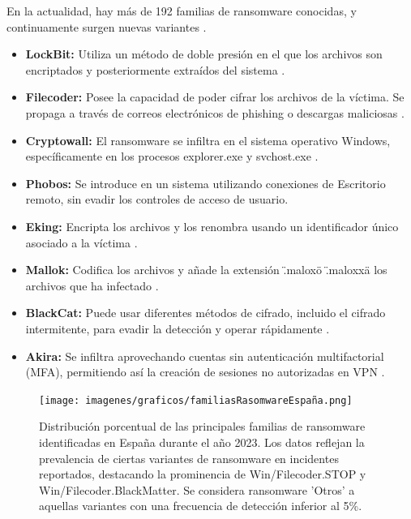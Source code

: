 
En la actualidad, hay más de 192 familias de ransomware conocidas, y continuamente surgen nuevas variantes \autocite{Herrero2024}.

\begin{itemize}
    \item \textbf{LockBit:} Utiliza un método de doble presión en el que los archivos son encriptados y posteriormente extraídos del sistema \autocite{Bhushan2024}.
    \item \textbf{Filecoder:} Posee la capacidad de poder cifrar los archivos de la víctima. Se propaga a través de correos electrónicos de phishing o descargas maliciosas \autocite{WeLiveSecurity2013}.
    \item \textbf{Cryptowall:} El ransomware se infiltra en el sistema operativo Windows, específicamente en los procesos explorer.exe y svchost.exe \autocite{Proofpoint2023}.
    \item \textbf{Phobos:} Se introduce en un sistema utilizando conexiones de Escritorio remoto, sin evadir los controles de acceso de usuario.
    \item \textbf{Eking:} Encripta los archivos y los renombra usando un identificador único asociado a la víctima \autocite{Infordisa2021}.
    \item \textbf{Mallok:} Codifica los archivos y añade la extensión \".malox\" o \".maloxx\" a los archivos que ha infectado \autocite{CyberzaintzaND}.
    \item \textbf{BlackCat:} Puede usar diferentes métodos de cifrado, incluido el cifrado intermitente, para evadir la detección y operar rápidamente \autocite{JDRRCiberseguridad2022}.
    \item \textbf{Akira:} Se infiltra aprovechando cuentas sin autenticación multifactorial (MFA), permitiendo así la creación de sesiones no autorizadas en VPN \autocite{Jaramillo2023}.
\end{itemize}


\begin{figure}[H]
    \centering
    \texttt{[image: imagenes/graficos/familiasRasomwareEspaña.png]} %
    \caption{Distribución porcentual de las principales familias de ransomware identificadas en España durante el año 2023. Los datos reflejan la prevalencia de ciertas variantes de ransomware en incidentes reportados, destacando la prominencia de Win/Filecoder.STOP y Win/Filecoder.BlackMatter. Se considera ransomware 'Otros' a aquellas variantes con una frecuencia de detección inferior al 5\%.\autocite{Herrero2024}}
    \label{fig:mi-grafico}
\end{figure}


